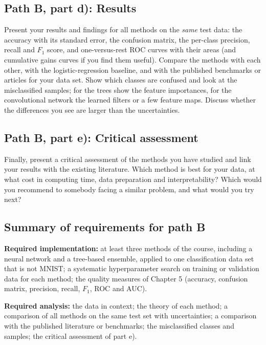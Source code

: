 \documentclass[11pt,a4paper]{article}
\begin{document}
\subsection*{Path B, part d): Results}

Present your results and findings for all methods on the \emph{same} test
data: the accuracy with its standard error, the confusion matrix, the
per-class precision, recall and $F_1$ score, and one-versus-rest ROC curves
with their areas (and cumulative gains curves if you find them useful).
Compare the methods with each other, with the logistic-regression baseline,
and with the published benchmarks or articles for your data set.  Show which
classes are confused and look at the misclassified samples; for the trees
show the feature importances, for the convolutional network the learned
filters or a few feature maps.  Discuss whether the differences you see are
larger than the uncertainties.

\subsection*{Path B, part e): Critical assessment}

Finally, present a critical assessment of the methods you have studied and
link your results with the existing literature.  Which method is best for
your data, at what cost in computing time, data preparation and
interpretability?  Which would you recommend to somebody facing a similar
problem, and what would you try next?

\subsection*{Summary of requirements for path B}

\textbf{Required implementation:} at least three methods of the course,
including a neural network and a tree-based ensemble, applied to one
classification data set that is not MNIST; a systematic hyperparameter
search on training or validation data for each method; the quality measures
of Chapter 5 (accuracy, confusion matrix, precision, recall, $F_1$, ROC and
AUC).

\textbf{Required analysis:} the data in context; the theory of each method;
a comparison of all methods on the same test set with uncertainties; a
comparison with the published literature or benchmarks; the misclassified
classes and samples; the critical assessment of part e).

\end{document}
